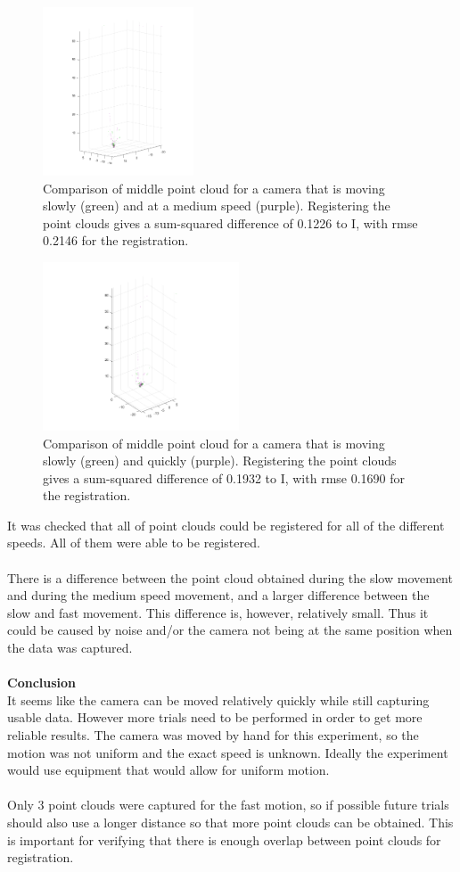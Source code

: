 \documentclass[12pt,a4paper]{article}
\begin{document}
	\begin{figure}[h]
		\centering
		\includegraphics[height=50mm, trim = 20mm 10mm 20mm 140mm, clip]{slow_med.png}
		\caption{Comparison of middle point cloud for a camera that is moving slowly (green) and at a medium speed (purple). Registering the point clouds gives a sum-squared difference of 0.1226 to I, with rmse 0.2146 for the registration.}
		\label{f: slow v med}
	\end{figure}

	\begin{figure}[h]
		\centering
		\includegraphics[height=50mm, trim = 20mm 10mm 20mm 100mm, clip]{slow_fast.png}
		\caption{Comparison of middle point cloud for a camera that is moving slowly (green) and quickly (purple). Registering the point clouds gives a sum-squared difference of 0.1932 to I, with rmse 0.1690 for the registration.}
		\label{f: slow v med}
	\end{figure}
\noindent
It was checked that all of point clouds could be registered for all of the different speeds. All of them were able to be registered.
\\\\
There is a difference between the point cloud obtained during the slow movement and during the medium speed movement, and a larger difference between the slow and fast movement. This difference is, however, relatively small. Thus it could be caused by noise and/or the camera not being at the same position when the data was captured.
\\\\
\textbf{Conclusion} \\
It seems like the camera can be moved relatively quickly while still capturing usable data. However more trials need to be performed in order to get more reliable results. The camera was moved by hand for this experiment, so the motion was not uniform and the exact speed is unknown. Ideally the experiment would use equipment that would allow for uniform motion.
\\\\
Only 3 point clouds were captured for the fast motion, so if possible future trials should also use a longer distance so that more point clouds can be obtained. This is important for verifying that there is enough overlap between point clouds for registration.
\end{document}
